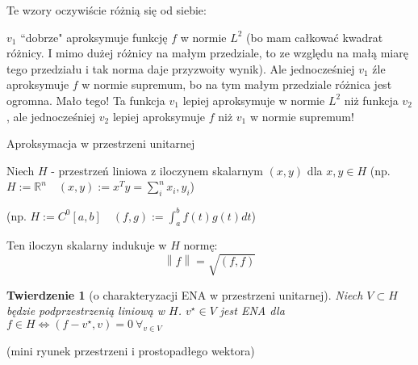 \documentclass[hidelinks,a4paper,fleqn,oneside]{book}
\newcommand{\RR}{\mathbb{R}}
\newcommand{\norm}[1]{\left\lVert#1\right\rVert}
\newtheorem{twierdz}{Twierdzenie}
\begin{document}
Te wzory oczywiście różnią się od siebie:

\begin{tikzpicture}

\end{tikzpicture}

$v_1$ ``dobrze" aproksymuje funkcję $f$ w normie $L^2$ (bo mam całkować kwadrat różnicy. I mimo dużej różnicy na małym przedziale, to ze względu na małą miarę tego przedziału i tak norma daje przyzwoity wynik). Ale jednocześniej $v_1$ źle aproksymuje $f$ w normie supremum, bo na tym małym przedziale różnica jest ogromna. Mało tego! Ta funkcja $v_1$ lepiej aproksymuje w normie $L^2$ niż funkcja $v_2$, ale jednocześniej $v_2$ lepiej aproksymuje $f$ niż $v_1$ w normie supremum!

\textrm{Aproksymacja w przestrzeni unitarnej}

Niech $H$ - przestrzeń liniowa z iloczynem skalarnym $(x, y)$ dla $x, y \in H$ (np. $H:=\RR^n \quad (x, y) := x^Ty = \sum_i^n x_i, y_i$)

(np. $H:=C^0[a, b] \quad (f, g) := \int_a^b f(t)g(t) dt$)

Ten iloczyn skalarny indukuje w $H$ normę:
\[
	\norm{f} = \sqrt{(f, f)}
\]

\begin{twierdz}[o charakteryzacji ENA w przestrzeni unitarnej]
Niech $V \subset H$ będzie podprzestrzenią liniową w $H$. $v^\star \in V$ jest ENA dla $f \in H \iff (f-v^\star, v) = 0 \ \forall_{v \in V}$ 
\end{twierdz}

(mini ryunek przestrzeni i prostopadłego wektora)
\end{document}
